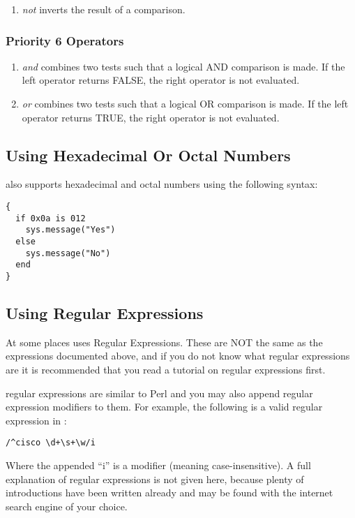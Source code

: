 \begin{enumerate}
\item {\it not} inverts the result of a comparison. 
\end{enumerate}


\subsubsection{Priority 6 Operators}

\begin{enumerate}
\item {\it and} combines two tests such that a logical AND comparison is made. 
If the left operator returns FALSE, the right operator is not evaluated.
\item {\it or} combines two tests such that a logical OR comparison is made. 
If the left operator returns TRUE, the right operator is not evaluated. 
\end{enumerate}


\subsection{Using Hexadecimal Or Octal Numbers}

\product also supports hexadecimal and octal numbers using the following 
syntax: 

\begin{lstlisting}
{
  if 0x0a is 012
    sys.message("Yes")
  else
    sys.message("No")
  end
}
\end{lstlisting}


\subsection{Using Regular Expressions}

At some places \product uses Regular Expressions. These are NOT the same as 
the expressions documented above, and if you do not know what regular 
expressions are it is recommended that you read a tutorial on regular 
expressions first.

\product regular expressions are similar to Perl and you may also append 
regular expression modifiers to them. For example, the following is a valid 
regular expression in \product: 

\begin{lstlisting}
/^cisco \d+\s+\w/i
\end{lstlisting}

Where the appended ``i'' is a modifier (meaning case-insensitive). A full 
explanation of regular expressions is not given here, because plenty of 
introductions have been written already and may be found with the internet 
search engine of your choice.


